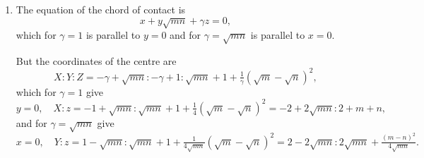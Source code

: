 \documentclass[12pt,a4paper]{article}
\theoremstyle{plain}
\theoremstyle{definition}
\theoremstyle{remark}
\begin{document}
\begin{enumerate}[label=\arabic*.]
Now writing $X$, $Y$, $Q$ in the place of $x$, $y$, $z$; $k' = 1$, and $\alpha = \{1 + \sqrt{mn}\}$, $\beta = 2$, $\gamma = (\sqrt{m} - \sqrt{n})^2$, we have
\begin{multline*}
-16[\{1 + \sqrt{mn}\}^2 + 8(\sqrt{m} - \sqrt{n})^2](ZQ + X^2) \\
= [4\{1 + \sqrt{mn}\}Z + 8Y - (4(\sqrt{m} - \sqrt{n})^2 + \{1 + \sqrt{mn}\}^2)Q]^2 \\
- [\{1 + \sqrt{mn}\}^2 + 8(\sqrt{m} - \sqrt{n})^2][4X - \{1 + \sqrt{mn}\}Q]^2 \\
- 16[\{1 + \sqrt{mn}\}X + 2Y + (\sqrt{m} - \sqrt{n})^2 Q]^2,
\end{multline*}
and the asymptotes are
\begin{multline*}
4\{1 + \sqrt{mn}\}Z + 8Y - [4(\sqrt{m} - \sqrt{n})^2 + \{1 + \sqrt{mn}\}^2]Q \\
= \pm\sqrt{\{1 + \sqrt{mn}\}^2 + 8(\sqrt{m} - \sqrt{n})^2}\,[4X - \{1 + \sqrt{mn}\}Q].
\end{multline*}

At the centre
\[4\{1 + \sqrt{mn}\}Z + 8Y - [4(\sqrt{m} - \sqrt{n})^2 + \{1 + \sqrt{mn}\}^2]Q = 0,\]
\[4X - \{1 + \sqrt{mn}\}Q = 0,\]
but the first equation is
\[\{1 + \sqrt{mn}\}[4Z - Q\{1 + \sqrt{mn}\}] + 8Y - 4(\sqrt{m} - \sqrt{n})^2 Q = 0,\]
so that we have
\[4Z = \{1 + \sqrt{mn}\}Q, \quad 2Y = (\sqrt{m} - \sqrt{n})^2 Q,\]
the first of these is
\[2(\sqrt{m} - \sqrt{n})^2(x - y) - \{1 + \sqrt{mn}\}^2(x - y) - (1 - mn)z = 0,\]
and the two together give
\[2Z(\sqrt{m} - \sqrt{n})^2 - \{1 + \sqrt{mn}\}Y = 0,\]
so that we have
\begin{align*}
2(\sqrt{m} - \sqrt{n})^2(x - y) - \{1 + \sqrt{mn}\}\{x - y\sqrt{mn}\} &= 0, \\
[\{1 + \sqrt{mn}\}^2 - 2(\sqrt{m} - \sqrt{n})^2](x - y) + (1 - mn)z &= 0,
\end{align*}
to determine the coordinates of the centre.

\item The equation of the chord of contact is
\[x + y\sqrt{mn} + \gamma z = 0,\]
which for $\gamma = 1$ is parallel to $y = 0$ and for $\gamma = \sqrt{mn}$ is parallel to $x = 0$.

But the coordinates of the centre are
\[X : Y : Z = -\gamma + \sqrt{mn} : -\gamma + 1 : \sqrt{mn} + 1 + \tfrac{1}{\gamma}(\sqrt{m} - \sqrt{n})^2,\]
which for $\gamma = 1$ give
\[y = 0, \quad X : z = -1 + \sqrt{mn} : \sqrt{mn} + 1 + \tfrac{1}{4}(\sqrt{m} - \sqrt{n})^2 = -2 + 2\sqrt{mn} : 2 + m + n,\]
and for $\gamma = \sqrt{mn}$ give
\[x = 0, \quad Y : z = 1 - \sqrt{mn} : \sqrt{mn} + 1 + \tfrac{1}{4\sqrt{mn}}(\sqrt{m} - \sqrt{n})^2 = 2 - 2\sqrt{mn} : 2\sqrt{mn} + \tfrac{(m - n)^2}{4\sqrt{mn}}.\]


\end{enumerate}
\end{document}
